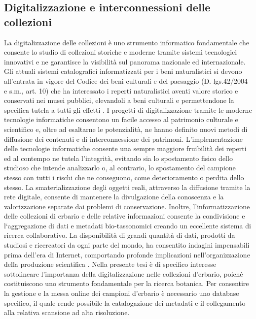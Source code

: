 \documentclass[main.tex]{subfiles}
\begin{document}
\subsection{Digitalizzazione e interconnessioni delle collezioni}

La digitalizzazione delle collezioni è uno strumento informatico fondamentale che consente lo studio di collezioni storiche e moderne tramite sistemi tecnologici innovativi e ne garantisce la visibilità sul panorama nazionale ed internazionale.
Gli attuali sistemi catalografici informatizzati per i beni naturalistici si devono all’entrata in vigore del Codice dei beni culturali e del paesaggio (D. lgs.42/2004 e s.m., art. 10) che ha interessato i reperti naturalistici aventi valore storico e conservati nei musei pubblici, elevandoli a beni culturali e permettendone la specifica tutela a tutti gli effetti \citep{corra}.
I progetti di digitalizzazione tramite le moderne tecnologie informatiche consentono un facile accesso al patrimonio culturale e scientifico e, oltre ad esaltarne le potenzialità, ne hanno definito nuovi metodi di diffusione dei contenuti e di interconnessione dei patrimoni.
L’implementazione delle tecnologie informatiche consente una sempre maggiore fruibilità dei reperti ed al contempo ne tutela l’integrità, evitando sia lo spostamento fisico dello studioso che intende analizzarlo o, al contrario, lo spostamento del campione stesso con tutti i rischi che ne conseguono, come deterioramento o perdita dello stesso. La smaterializzazione degli oggetti reali, attraverso la diffusione tramite la rete digitale, consente di mantenere la divulgazione della conoscenza e la valorizzazione separate dai problemi di conservazione.
Inoltre, l’informatizzazione delle collezioni di erbario e delle relative informazioni consente la condivisione e l‘aggregazione di dati e metadati bio-tassonomici creando un eccellente sistema di ricerca collaborativo. La disponibilità di grandi quantità di dati, prodotti da studiosi e ricercatori da ogni parte del mondo, ha consentito indagini impensabili prima dell’era di Internet, comportando profonde implicazioni nell’organizzazione della produzione scientifica \citep{def}.
Nella presente tesi è di specifico interesse sottolineare l’importanza della digitalizzazione nelle collezioni d’erbario, poiché costituiscono uno strumento fondamentale per la ricerca botanica. Per consentire la gestione e la messa online dei campioni d’erbario è necessario uno database specifico, il quale rende possibile la catalogazione dei metadati e il collegamento alla relativa scansione ad alta risoluzione.
\end{document}
